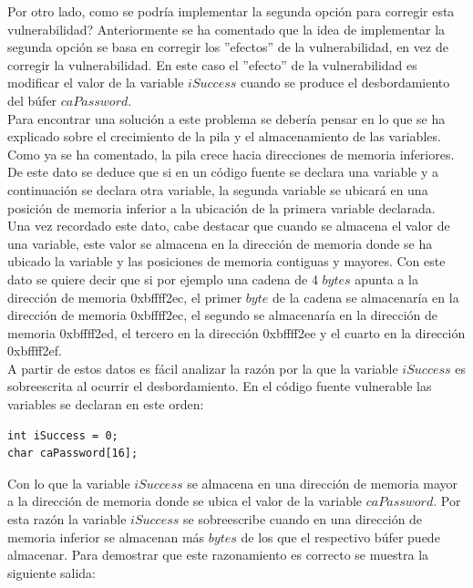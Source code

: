 \documentclass [titlepage, 12pt]{article}
\begin{document}
Por otro lado, como se podr\'ia implementar la segunda opci\'on para corregir esta vulnerabilidad? Anteriormente se ha comentado que la idea de implementar la segunda opci\'on se basa en corregir los ''efectos'' de la vulnerabilidad, en vez de corregir la vulnerabilidad. En este caso el ''efecto'' de la vulnerabilidad es modificar el valor de la variable $iSuccess$ cuando se produce el desbordamiento del b\'ufer $caPassword$. \\
Para encontrar una soluci\'on a este problema se deber\'ia pensar en lo que se ha explicado sobre el crecimiento de la pila y el almacenamiento de las variables. Como ya se ha comentado, la pila crece hacia direcciones de memoria inferiores. De este dato se deduce que si en un c\'odigo fuente se declara una variable y a continuaci\'on se declara otra variable, la segunda variable se ubicar\'a en una posici\'on de memoria inferior a la ubicaci\'on de la primera variable declarada.\\
Una vez recordado este dato, cabe destacar que cuando se almacena el valor de una variable, este valor se almacena en la direcci\'on de memoria donde se ha ubicado la variable y las posiciones de memoria contiguas y mayores. Con este dato se quiere decir que si por ejemplo una cadena de 4 $bytes$ apunta a la direcci\'on de memoria 0xbffff2ec, el primer $byte$ de la cadena se almacenar\'ia en la direcci\'on de memoria 0xbffff2ec, el segundo se almacenar\'ia en la direcci\'on de memoria 0xbffff2ed, el tercero en la direcci\'on 0xbffff2ee y el cuarto en la direcci\'on 0xbffff2ef.\\

A partir de estos datos es f\'acil analizar la raz\'on por la que la variable $iSuccess$ es sobreescrita al ocurrir el desbordamiento. En el c\'odigo fuente vulnerable las variables se declaran en este orden:

\lstset{language=C++,caption=C\'odigo vulnerable,label=fig:codigoVulnerable}
\begin{lstlisting}
int iSuccess = 0;
char caPassword[16];
\end{lstlisting} 

Con lo que la variable $iSuccess$ se almacena en una direcci\'on de memoria mayor a la direcci\'on de memoria donde se ubica el valor de la variable $caPassword$. Por esta raz\'on la variable $iSuccess$ se sobreescribe cuando en una direcci\'on de memoria inferior se almacenan m\'as $bytes$ de los que el respectivo b\'ufer puede almacenar. Para demostrar que este razonamiento es correcto se muestra la siguiente salida: 
\end{document}
